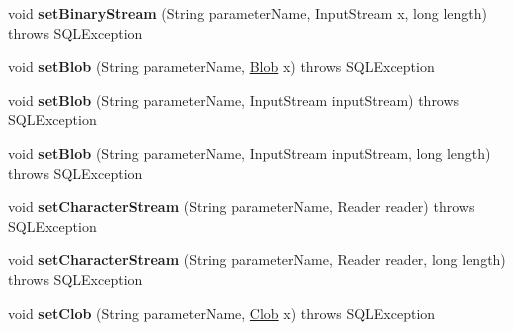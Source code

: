 \begin{DoxyCompactItemize}
\item 
\mbox{\label{classcom_1_1mysql_1_1cj_1_1jdbc_1_1_callable_statement_aa36ee2696fb6f22333d0e8c59dcc5d93}} 
void {\bfseries set\+Binary\+Stream} (String parameter\+Name, Input\+Stream x, long length)  throws S\+Q\+L\+Exception 
\item 
\mbox{\label{classcom_1_1mysql_1_1cj_1_1jdbc_1_1_callable_statement_ae0e2596de05204678b8caa247366b7f8}} 
void {\bfseries set\+Blob} (String parameter\+Name, \mbox{\hyperlink{classcom_1_1mysql_1_1cj_1_1jdbc_1_1_blob}{Blob}} x)  throws S\+Q\+L\+Exception 
\item 
\mbox{\label{classcom_1_1mysql_1_1cj_1_1jdbc_1_1_callable_statement_a862ed16900aced622be6e676349d85c2}} 
void {\bfseries set\+Blob} (String parameter\+Name, Input\+Stream input\+Stream)  throws S\+Q\+L\+Exception 
\item 
\mbox{\label{classcom_1_1mysql_1_1cj_1_1jdbc_1_1_callable_statement_a7d84e8ba7421f23ebe2a024cedd2f67a}} 
void {\bfseries set\+Blob} (String parameter\+Name, Input\+Stream input\+Stream, long length)  throws S\+Q\+L\+Exception 
\item 
\mbox{\label{classcom_1_1mysql_1_1cj_1_1jdbc_1_1_callable_statement_a59ba89c0a75b368c818f72cfaa69209b}} 
void {\bfseries set\+Character\+Stream} (String parameter\+Name, Reader reader)  throws S\+Q\+L\+Exception 
\item 
\mbox{\label{classcom_1_1mysql_1_1cj_1_1jdbc_1_1_callable_statement_a4dd5f3eb90bd5aec28008772eab958fa}} 
void {\bfseries set\+Character\+Stream} (String parameter\+Name, Reader reader, long length)  throws S\+Q\+L\+Exception 
\item 
\mbox{\label{classcom_1_1mysql_1_1cj_1_1jdbc_1_1_callable_statement_a7f54a9f87ebdf219de9940389d32f3d1}} 
void {\bfseries set\+Clob} (String parameter\+Name, \mbox{\hyperlink{classcom_1_1mysql_1_1cj_1_1jdbc_1_1_clob}{Clob}} x)  throws S\+Q\+L\+Exception 

\end{DoxyCompactItemize}
